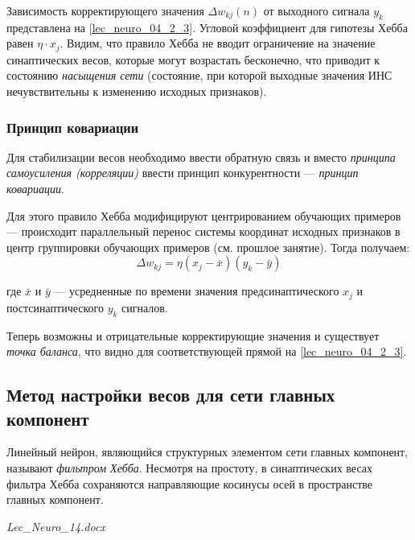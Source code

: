 \documentclass{article}
\numberwithin{equation}{subsection}
\begin{document}
Зависимость корректирующего значения $\Delta w_{kj} (n)$ от выходного сигнала $y_k$
представлена на \ref{lec_neuro_04_2_3}. Угловой коэффициент для гипотезы Хебба равен
$\eta \cdot x_j$.
Видим, что правило Хебба не вводит ограничение на значение синаптических весов, которые могут 
возрастать бесконечно, что приводит к состоянию \textit{насыщения сети} 
(состояние, при которой выходные значения ИНС нечувствительны к изменению исходных признаков).




\subsubsection{Принцип ковариации}

Для стабилизации весов необходимо ввести обратную связь и вместо \textit{принципа 
самоусиления (корреляции)} ввести принцип конкурентности --- \textit{принцип ковариации}.

Для этого правило Хебба модифицируют центрированием обучающих примеров --- происходит параллельный 
перенос системы координат исходных признаков в центр группировки обучающих примеров 
(см. прошлое занятие). Тогда получаем:
\begin{equation}
    \Delta w_{kj} = \eta \left( x_j - \bar{x} \right) \left( y_k - \bar{y} \right)
\end{equation}

\noindent
где $\bar{x}$ и $\bar{y}$ --- усредненные по времени значения предсинаптического $x_j$ 
и постсинаптического $y_k$ сигналов.

Теперь возможны и отрицательные корректирующие значения и существует \textit{точка баланса},
что видно для соответствующей прямой на \ref{lec_neuro_04_2_3}. 




\subsection{Метод настройки весов для сети главных компонент}

Линейный нейрон, являющийся структурных элементом сети главных компонент, называют 
\textit{фильтром Хебба}.
Несмотря на простоту, в синаптических весах фильтра Хебба сохраняются 
направляющие косинусы осей в пространстве главных компонент.

\begin{myquote}
    \textit{Lec\_Neuro\_14.docx}
\end{myquote}
\end{document}
